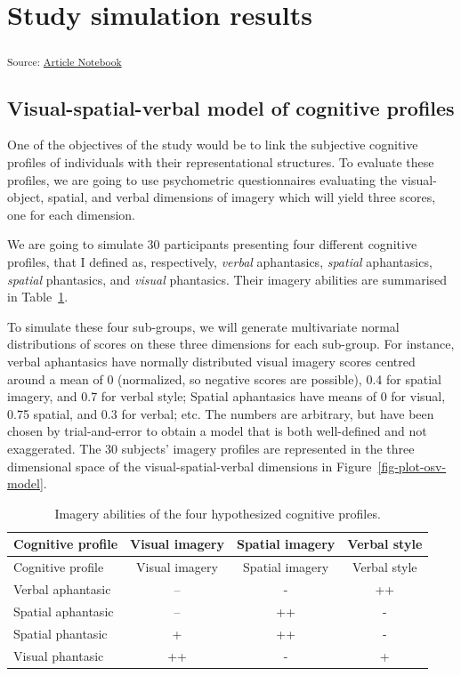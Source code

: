 \documentclass[
  authoryear]{elsarticle}
\begin{document}
\section{Study simulation results}\label{study-simulation-results}

\textsubscript{Source:
\href{https://m-delem.github.io/2499-similarity-manuscript/index.qmd.html}{Article
Notebook}}

\subsection{Visual-spatial-verbal model of cognitive
profiles}\label{sec-osv-model-theory}

One of the objectives of the study would be to link the subjective
cognitive profiles of individuals with their representational
structures. To evaluate these profiles, we are going to use psychometric
questionnaires evaluating the visual-object, spatial, and verbal
dimensions of imagery which will yield three scores, one for each
dimension.

We are going to simulate 30 participants presenting four different
cognitive profiles, that I defined as, respectively, \emph{verbal}
aphantasics, \emph{spatial} aphantasics, \emph{spatial} phantasics, and
\emph{visual} phantasics. Their imagery abilities are summarised in
Table~\ref{tbl-imageries}.

To simulate these four sub-groups, we will generate multivariate normal
distributions of scores on these three dimensions for each sub-group.
For instance, verbal aphantasics have normally distributed visual
imagery scores centred around a mean of 0 (normalized, so negative
scores are possible), 0.4 for spatial imagery, and 0.7 for verbal style;
Spatial aphantasics have means of 0 for visual, 0.75 spatial, and 0.3
for verbal; etc. The numbers are arbitrary, but have been chosen by
trial-and-error to obtain a model that is both well-defined and not
exaggerated. The 30 subjects' imagery profiles are represented in the
three dimensional space of the visual-spatial-verbal dimensions in
Figure~\ref{fig-plot-osv-model}.

\begin{longtable}[]{@{}lccc@{}}
\caption{Imagery abilities of the four hypothesized cognitive
profiles.}\label{tbl-imageries}\tabularnewline
\toprule\noalign{}
Cognitive profile & Visual imagery & Spatial imagery & Verbal style \\
\midrule\noalign{}
\endfirsthead
\toprule\noalign{}
Cognitive profile & Visual imagery & Spatial imagery & Verbal style \\
\midrule\noalign{}
\endhead
\bottomrule\noalign{}
\endlastfoot
Verbal aphantasic & -- & - & ++ \\
Spatial aphantasic & -- & ++ & - \\
Spatial phantasic & + & ++ & - \\
Visual phantasic & ++ & - & + \\
\end{longtable}
\end{document}
